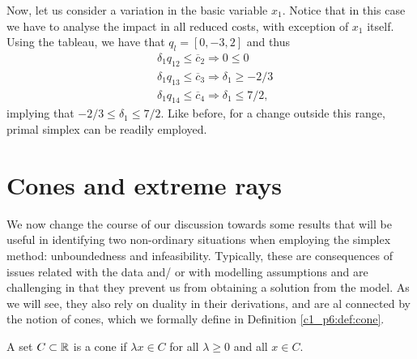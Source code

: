 Now, let us consider a variation in the basic variable $x_1$. Notice that in this case we have to analyse the impact in all reduced costs, with exception of $x_1$ itself. Using the tableau, we have that $q_l = [0,-3,2]$ and thus
%
\begin{align*}
	& \delta_1 q_{12} \leq \overline{c}_2 \Rightarrow 0 \leq 0 \\
	& \delta_1 q_{13} \leq \overline{c}_3 \Rightarrow \delta_1 \geq -2/3  \\
	& \delta_1 q_{14} \leq \overline{c}_4 \Rightarrow \delta_1 \leq 7/2, 
\end{align*}
%
implying that $-2/3 \leq \delta_1 \leq 7/2$. Like before, for a change outside this range, primal simplex can be readily employed.


\section{Cones and extreme rays}

We now change the course of our discussion towards some results that will be useful in identifying two non-ordinary situations when employing the simplex method: unboundedness and infeasibility. Typically, these are consequences of issues related with the data and/ or with modelling assumptions and are challenging in that they prevent us from obtaining a solution from the model. As we will see, they also rely on duality in their derivations, and are al connected by the notion of cones, which we formally define in Definition \ref{c1_p6:def:cone}.

\begin{definition}[Cones]\label{p1c6:def:cone}
	A set $C \subset \mathbb{R}$ is a cone if $\lambda x \in C$ for all $\lambda \geq 0$ and all $x \in C$.	
\end{definition}

